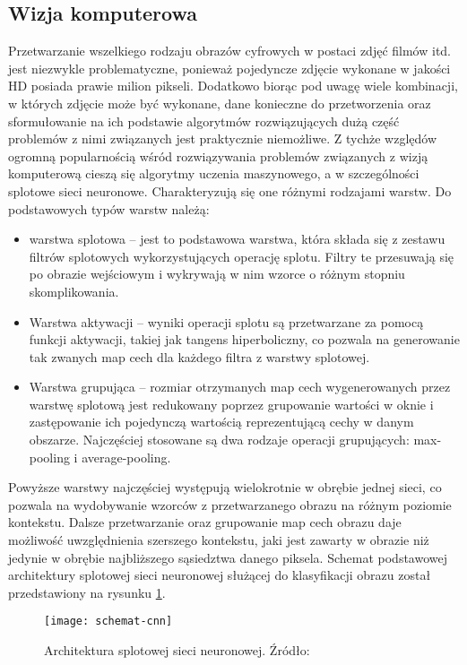 \subsection{Wizja komputerowa}
Przetwarzanie wszelkiego rodzaju obrazów cyfrowych w postaci zdjęć filmów itd. jest niezwykle problematyczne, ponieważ pojedyncze zdjęcie wykonane w jakości HD posiada prawie milion pikseli. Dodatkowo biorąc pod uwagę wiele kombinacji, w których zdjęcie może być wykonane, dane konieczne do przetworzenia oraz sformułowanie na ich podstawie algorytmów rozwiązujących dużą część problemów z nimi związanych jest praktycznie niemożliwe. Z tychże względów ogromną popularnością wśród rozwiązywania problemów związanych z wizją komputerową cieszą się algorytmy uczenia maszynowego, a w szczególności splotowe sieci neuronowe. Charakteryzują się one różnymi rodzajami warstw. Do podstawowych typów warstw należą:
\begin{itemize}
  \item warstwa splotowa -- jest to podstawowa warstwa, która składa się z zestawu filtrów splotowych wykorzystujących operację splotu. Filtry te przesuwają się po obrazie wejściowym i wykrywają w nim wzorce o różnym stopniu skomplikowania.
  \item Warstwa aktywacji -- wyniki operacji splotu są przetwarzane za pomocą funkcji aktywacji, takiej jak tangens hiperboliczny, co pozwala na generowanie tak zwanych map cech dla każdego filtra z warstwy splotowej.
  \item Warstwa grupująca -- rozmiar otrzymanych map cech wygenerowanych przez warstwę splotową jest redukowany poprzez grupowanie wartości w oknie i zastępowanie ich pojedynczą wartością reprezentującą cechy w danym obszarze. Najczęściej stosowane są dwa rodzaje operacji grupujących: max-pooling i average-pooling.
\end{itemize}
Powyższe warstwy najczęściej występują wielokrotnie w obrębie jednej sieci, co pozwala na wydobywanie wzorców z przetwarzanego obrazu na różnym poziomie kontekstu. Dalsze przetwarzanie oraz grupowanie map cech obrazu daje możliwość uwzględnienia szerszego kontekstu, jaki jest zawarty w obrazie niż jedynie w obrębie najbliższego sąsiedztwa danego piksela. Schemat podstawowej architektury splotowej sieci neuronowej służącej do klasyfikacji obrazu został przedstawiony na rysunku \ref{fig:schemat-cnn}.
\begin{figure}[!h]
  \centering
  \texttt{[image: schemat-cnn]}
  \caption{Architektura splotowej sieci neuronowej. Źródło: \cite{WikipediaEN:CNN}}
  \label{fig:schemat-cnn}
\end{figure}

